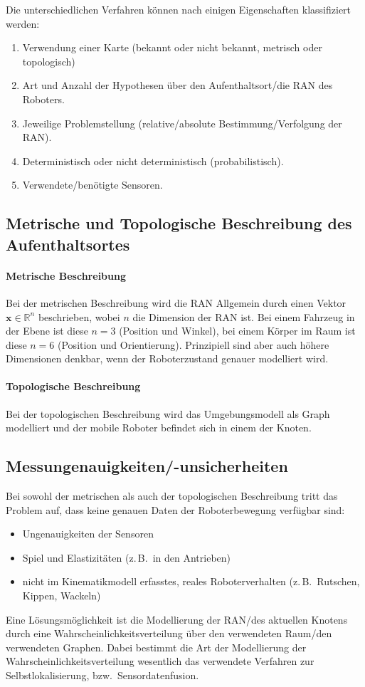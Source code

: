 \documentclass[a4paper, 11pt, accentcolor = tud3b]{tudreport}
\newcommand{\R}{\mathbb{R}}
\renewcommand{\vec}[1]{\boldsymbol{\mathbf{#1}}}
\newcommand{\bzw}{bzw.~}
\newcommand{\zB}{z.\,B.~}
\begin{document}
			Die unterschiedlichen Verfahren können nach einigen Eigenschaften klassifiziert werden:
			\begin{enumerate}
				\item Verwendung einer Karte (bekannt oder nicht bekannt, metrisch oder topologisch)
				\item Art und Anzahl der Hypothesen über den Aufenthaltsort/die RAN des Roboters.
				\item Jeweilige Problemstellung (relative/absolute Bestimmung/Verfolgung der RAN).
				\item Deterministisch oder nicht deterministisch (probabilistisch).
				\item Verwendete/benötigte Sensoren.
			\end{enumerate}
		
			\subsection{Metrische und Topologische Beschreibung des Aufenthaltsortes}
				\paragraph{Metrische Beschreibung}
					Bei der metrischen Beschreibung wird die RAN Allgemein durch einen Vektor \( \vec{x} \in \R^n \) beschrieben, wobei \(n\) die Dimension der RAN ist. Bei einem Fahrzeug in der Ebene ist diese \( n = 3 \) (Position und Winkel), bei einem Körper im Raum ist diese \( n = 6 \) (Position und Orientierung). Prinzipiell sind aber auch höhere Dimensionen denkbar, wenn der Roboterzustand genauer modelliert wird.
				
				\paragraph{Topologische Beschreibung}
					Bei der topologischen Beschreibung wird das Umgebungsmodell als Graph modelliert und der mobile Roboter befindet sich in einem der Knoten.
			
			\subsection{Messungenauigkeiten/-unsicherheiten}
				Bei sowohl der metrischen als auch der topologischen Beschreibung tritt das Problem auf, dass keine genauen Daten der Roboterbewegung verfügbar sind:
				\begin{itemize}
					\item Ungenauigkeiten der Sensoren
					\item Spiel und Elastizitäten (\zB in den Antrieben)
					\item nicht im Kinematikmodell erfasstes, reales Roboterverhalten (\zB Rutschen, Kippen, Wackeln)
				\end{itemize}
				Eine Lösungsmöglichkeit ist die Modellierung der RAN/des aktuellen Knotens durch eine Wahrscheinlichkeitsverteilung über den verwendeten Raum/den verwendeten Graphen. Dabei bestimmt die Art der Modellierung der Wahrscheinlichkeitsverteilung wesentlich das verwendete Verfahren zur Selbstlokalisierung, \bzw Sensordatenfusion.
\end{document}
